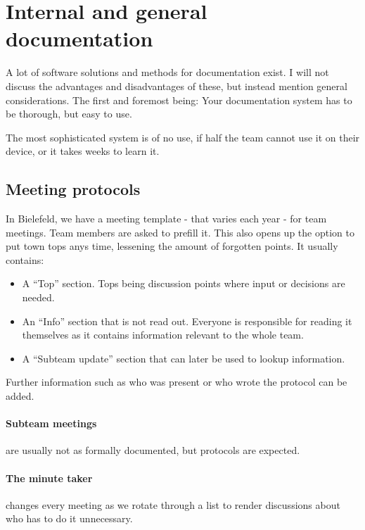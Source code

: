 

\section{Internal and general documentation}\label{sec:internal-and-general-documentation}
A lot of software solutions and methods for documentation exist.
I will not discuss the advantages and disadvantages of these, but instead mention general considerations.
The first and foremost being: Your documentation system has to be thorough, but easy to use.

The most sophisticated system is of no use, if half the team cannot use it on their device, or it takes
weeks to learn it.

\subsection{Meeting protocols}\label{subsec:meeting-protocols}
In Bielefeld, we have a meeting template - that varies each year - for team meetings.
Team members are asked to prefill it.
This also opens up the option to put town tops anys time, lessening the amount of forgotten points.
It usually contains:
\begin{itemize}
    \item A ``Top'' section.
    Tops being discussion points where input or decisions are needed.
    \item An ``Info'' section that is not read out.
    Everyone is responsible for reading it themselves as it contains
    information relevant to the whole team.
    \item A ``Subteam update'' section that can later be used to lookup information.
\end{itemize}
Further information such as who was present or who wrote the protocol can be added.

\paragraph{Subteam meetings} are usually not as formally documented, but protocols are expected.

\paragraph{The minute taker} changes every meeting as we rotate through a list to render discussions about who has
to do it unnecessary.

